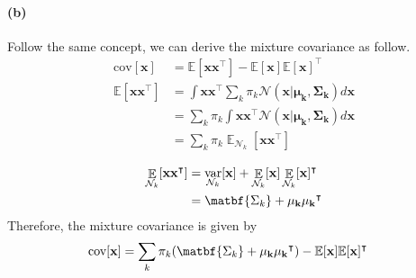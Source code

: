 \documentclass[11pt, letterpaper]{article}
\begin{document}
\paragraph{(b)}
Follow the same concept, we can derive the mixture covariance as follow.
\begin{align*}
    \text{cov}[\mathbf{x}] &= \mathbb{E}[\mathbf{x}\mathbf{x}^{\intercal}] - \mathbb{E}[\mathbf{x}]\mathbb{E}[\mathbf{x}]^{\intercal} \\
    \mathbb{E}[\mathbf{x}\mathbf{x}^{\intercal}]
        &= \int \mathbf{x}\mathbf{x}^{\intercal} \sum_k \pi_k \mathcal{N}(\mathbf{x}|\mathbf{\mu_k}, \mathbf{\Sigma_k}) d\mathbf{x} \\
        &= \sum_k \pi_k \int \mathbf{x}\mathbf{x}^{\intercal} \mathcal{N}(\mathbf{x}|\mathbf{\mu_k}, \mathbf{\Sigma_k}) d\mathbf{x} \\
        &= \sum_k \pi_k \mathop{\mathbb{E}}_{\mathcal{N}_k}[\mathbf{x}\mathbf{x}^{\intercal}] \\
\end{align*}
\begin{align*}
    \mathop{\mathbb{E}}_{\mathcal{N}_k}[\mathbf{x}\mathbf{x}^{\intercal}]
        &= \mathop{\text{var}}_{\mathcal{N}_k}[\mathbf{x}] + \mathop{\mathbb{E}}_{\mathcal{N}_k}[\mathbf{x}] \mathop{\mathbb{E}}_{\mathcal{N}_k}[\mathbf{x}]^{\intercal} \\
        &= \matbf{\Sigma_k} + \mathbf{\mu_k}\mathbf{\mu_k}^{\intercal}
\end{align*}
Therefore, the mixture covariance is given by
\begin{align*}
    \text{cov}[\mathbf{x}]
        &= \sum_k \pi_k (\matbf{\Sigma_k} + \mathbf{\mu_k}\mathbf{\mu_k}^{\intercal})
           - \mathbb{E}[\mathbf{x}]\mathbb{E}[\mathbf{x}]^{\intercal}
\end{align*}
\end{document}
